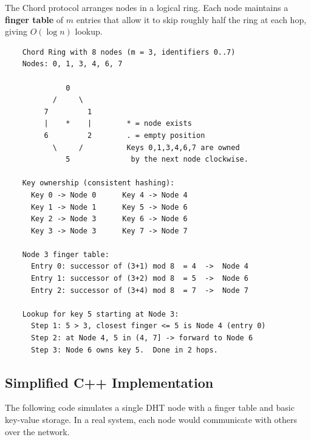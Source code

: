 The Chord protocol arranges nodes in a logical ring. Each node maintains a \textbf{finger table} of $m$ entries that allow it to skip roughly half the ring at each hop, giving $O(\log n)$ lookup.

\begin{verbatim}
    Chord Ring with 8 nodes (m = 3, identifiers 0..7)
    Nodes: 0, 1, 3, 4, 6, 7

              0
           /     \
         7         1
         |    *    |        * = node exists
         6         2        . = empty position
           \     /          Keys 0,1,3,4,6,7 are owned
              5              by the next node clockwise.

    Key ownership (consistent hashing):
      Key 0 -> Node 0      Key 4 -> Node 4
      Key 1 -> Node 1      Key 5 -> Node 6
      Key 2 -> Node 3      Key 6 -> Node 6
      Key 3 -> Node 3      Key 7 -> Node 7

    Node 3 finger table:
      Entry 0: successor of (3+1) mod 8  = 4  ->  Node 4
      Entry 1: successor of (3+2) mod 8  = 5  ->  Node 6
      Entry 2: successor of (3+4) mod 8  = 7  ->  Node 7

    Lookup for key 5 starting at Node 3:
      Step 1: 5 > 3, closest finger <= 5 is Node 4 (entry 0)
      Step 2: at Node 4, 5 in (4, 7] -> forward to Node 6
      Step 3: Node 6 owns key 5.  Done in 2 hops.
\end{verbatim}

\subsection{Simplified C++ Implementation}

The following code simulates a single DHT node with a finger table and basic key-value storage. In a real system, each node would communicate with others over the network.

